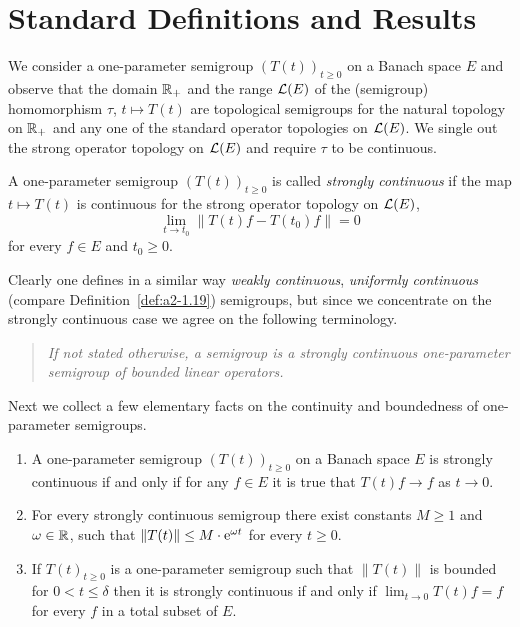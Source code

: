 \section{Standard Definitions and Results}\label{sec:a1-1}%
We consider a one-parameter semigroup $(T(t))_{t \geq 0}$ on a Banach space $E$ and observe that the domain $\mathbb{R}_{+}$ and the range $\mathcal{L}(E)$ of the (semigroup) homomorphism $\tau $, $ t \mapsto T(t)$ are topological semigroups for the natural topology on $\mathbb{R}_{+}$ and any one of the standard operator topologies on $\mathcal{L}(E)$.
We single out the strong operator topology on $\mathcal{L}(E)$ and require $\tau$ to be continuous.
\begin{definition}\label{def:a1-1.1}
A one-parameter semigroup $(T(t))_{t\geq0}$ is called \emph{strongly continuous} if the map $t \mapsto T(t)$ is continuous for the strong operator topology on $\mathcal{L}(E)$, \eg
\[
	\lim_{t\to t_{0}} \|T(t)f - T(t_{0})f\| = 0
\]
for every $f \in E$ and $t_{0} \geq 0$.
\end{definition}
Clearly one defines in a similar way \emph{weakly continuous}, \resp \emph{uniformly continuous} (compare Definition~\ref{def:a2-1.19}) semigroups, but since we concentrate on the strongly continuous case we agree on the following terminology.
\begin{quote}
\textit{If not stated otherwise, a \emph{semigroup} is a strongly continuous one-parameter semigroup of bounded linear operators. }
\end{quote}
Next we collect a few elementary facts on the continuity and boundedness of one-parameter semigroups.
\begin{remarks}\label{rem:a1-1.2}
\begin{enumerate}[\upshape(i), wide, labelindent=.25em]

\item 
A one-parameter semigroup $(T(t))_{t \geq 0}$ on a Banach space $E$ is strongly continuous if and only if for any $f \in E$ it is true that $T(t)f \to f$ as $t \to 0$.

\item 
For every strongly continuous semigroup there exist constants $ M \geq 1 $ and $ \omega \in \mathbb{R} $, such that 
$ \lVert T(t) \rVert \leq M \cdot \eu^{ \omega t} $ for every $  t \geq 0 $.

\item If\/ $ T(t)_{t\geq0} $ is a one-parameter semigroup such that $ \lVert T(t) \rVert $ is bounded for
$ 0 < t \leq \delta $ then it is strongly continuous if and only if\/ $ \lim_{t\to0} T(t)f = f $ for every $ f $ in a total subset of\/ $ E $.

\end{enumerate}
\end{remarks}
